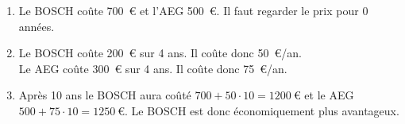 %
%
    \begin{enumerate}
        \item Le BOSCH coûte 700~€ et l'AEG 500~€. Il faut regarder le prix pour 0 années.
        \item Le BOSCH coûte 200~€ sur 4 ans. Il coûte donc 50~€/an.\\
        Le AEG coûte 300~€ sur 4 ans. Il coûte donc 75~€/an.
        \item Après 10 ans le BOSCH aura coûté $700 + 50\cdot 10 = 1200~€$ et le AEG $500 + 75\cdot 10 = 1250~€$. Le BOSCH est donc économiquement plus avantageux.
    \end{enumerate}

